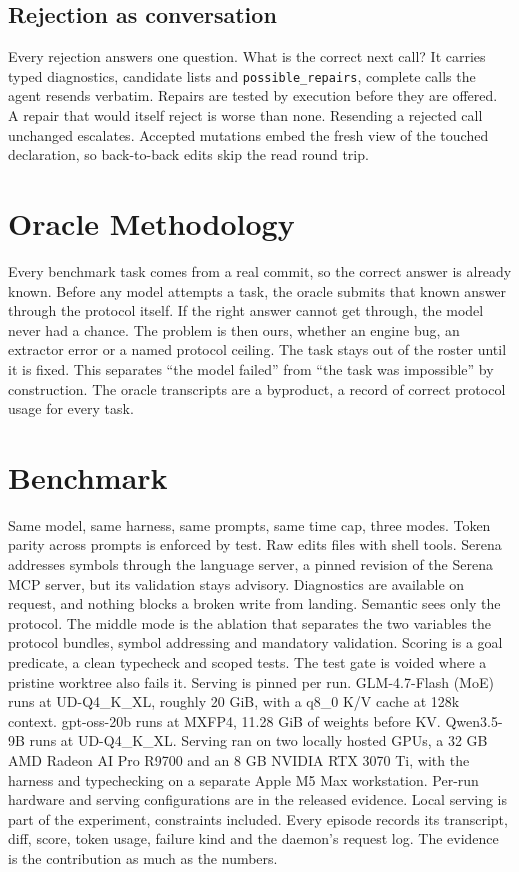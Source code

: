 \documentclass[11pt]{article}
\begin{document}
\subsection{Rejection as conversation}
Every rejection answers one question. What is the correct next call?
It carries typed diagnostics, candidate lists and
\texttt{possible\_repairs}, complete calls the agent resends verbatim.
Repairs are tested by execution before they are offered. A repair that
would itself reject is worse than none. Resending a rejected call
unchanged escalates. Accepted mutations embed the fresh view of the
touched declaration, so back-to-back edits skip the read round trip.

\section{Oracle Methodology}
Every benchmark task comes from a real commit, so the correct answer is
already known. Before any model attempts a task, the oracle submits
that known answer through the protocol itself. If the right answer
cannot get through, the model never had a chance. The problem is then
ours, whether an engine bug, an extractor error or a named protocol
ceiling. The task stays out of the roster until it is fixed. This
separates ``the model failed'' from ``the task was impossible'' by
construction. The oracle transcripts are a byproduct, a record of
correct protocol usage for every task.

\section{Benchmark}
Same model, same harness, same prompts, same time cap, three modes.
Token parity across prompts is enforced by test. Raw edits files with
shell tools. Serena addresses symbols through the language server, a
pinned revision of the Serena MCP server, but its validation stays
advisory. Diagnostics are available on request, and nothing blocks a
broken write from landing. Semantic sees only the protocol. The middle
mode is the ablation that separates the two variables the protocol
bundles, symbol addressing and mandatory validation. Scoring is a goal
predicate, a clean typecheck and scoped tests. The test gate is voided
where a pristine worktree also fails it. Serving is pinned per run.
GLM-4.7-Flash (MoE) runs at UD-Q4\_K\_XL, roughly 20 GiB, with a q8\_0
K/V cache at 128k context. gpt-oss-20b runs at MXFP4, 11.28 GiB of
weights before KV. Qwen3.5-9B runs at UD-Q4\_K\_XL. Serving ran on two
locally hosted GPUs, a 32 GB AMD Radeon AI Pro R9700 and an 8 GB NVIDIA
RTX 3070 Ti, with the harness and typechecking on a separate Apple M5
Max workstation. Per-run hardware and serving configurations are in the
released evidence. Local serving is part of the experiment, constraints
included. Every episode records its
transcript, diff, score, token usage, failure kind and the daemon's
request log. The evidence is the contribution as much as the numbers.
\end{document}
